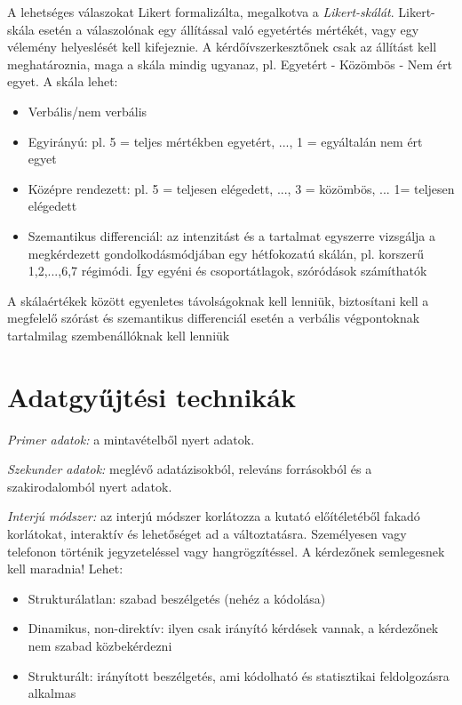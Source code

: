 A lehetséges válaszokat Likert formalizálta, megalkotva a \emph{Likert-skálát}. Likert-skála esetén a válaszolónak egy állítással való egyetértés mértékét, vagy egy vélemény helyeslését kell kifejeznie.  A kérdőívszerkesztőnek csak az állítást kell meghatároznia, maga a skála mindig ugyanaz, pl. Egyetért - Közömbös - Nem ért egyet. A skála lehet:
\begin{itemize}
\item Verbális/nem verbális
\item Egyirányú: pl. 5 = teljes mértékben egyetért, ..., 1 = egyáltalán nem ért egyet
\item Középre rendezett: pl. 5 = teljesen elégedett, ..., 3 = közömbös, ... 1= teljesen elégedett
\item Szemantikus differenciál: az intenzitást és a tartalmat egyszerre vizsgálja a megkérdezett gondolkodásmódjában egy hétfokozatú skálán, pl. korszerű 1,2,...,6,7 régimódi. Így egyéni és csoportátlagok, szóródások számíthatók
\end{itemize}
A skálaértékek között egyenletes távolságoknak kell lenniük, biztosítani kell a megfelelő szórást és szemantikus differenciál esetén a verbális végpontoknak tartalmilag szembenállóknak kell lenniük

\section{Adatgyűjtési technikák}

\emph{Primer adatok:} a mintavételből nyert adatok.

\emph{Szekunder adatok:} meglévő adatázisokból, releváns forrásokból és a szakirodalomból nyert adatok.

\emph{Interjú módszer:} az interjú módszer korlátozza a kutató előítéletéből fakadó korlátokat, interaktív és lehetőséget ad a változtatásra. Személyesen vagy telefonon történik jegyzeteléssel vagy hangrögzítéssel. A kérdezőnek semlegesnek kell maradnia! Lehet:
\begin{itemize}
\item Strukturálatlan: szabad beszélgetés (nehéz a kódolása)
\item Dinamikus, non-direktív: ilyen csak irányító kérdések vannak, a kérdezőnek nem szabad közbekérdezni
\item Strukturált: irányított beszélgetés, ami kódolható és statisztikai feldolgozásra alkalmas
\end{itemize}

